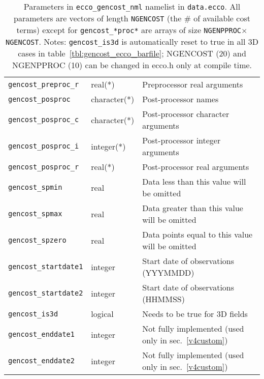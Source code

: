 \begin{table}[!ht]
\begin{tabular}{lll}
\texttt{gencost\_preproc\_r} 	&	real(*)			&	Preprocessor real arguments 	\\
\texttt{gencost\_posproc} 		&	character(*)	&	Post-processor names \\
\texttt{gencost\_posproc\_c} 	&	character(*)	&	Post-processor character arguments 	\\
\texttt{gencost\_posproc\_i} 	&	integer(*) 		&	Post-processor integer arguments 	\\
\texttt{gencost\_posproc\_r} 	&	real(*)			&	Post-processor real arguments 	\\
\hline
\texttt{gencost\_spmin}		&	real			&	Data less than this value will be omitted \\
\texttt{gencost\_spmax}		&	real			&	Data greater than this value will be omitted \\
\texttt{gencost\_spzero}		&	real			&	Data points equal to this value will be omitted \\
\texttt{gencost\_startdate1} 	&	integer			&	Start date of observations (YYYMMDD)	\\
\texttt{gencost\_startdate2} 	&	integer			&	Start date of observations (HHMMSS)				\\
\texttt{gencost\_is3d}			&	logical 		&	Needs to be true for 3D fields \\
\hline
\texttt{gencost\_enddate1} 	&	integer	&	Not fully implemented (used only in sec.~\ref{v4custom})\\
\texttt{gencost\_enddate2} 	&	integer	&	Not fully implemented (used only in sec.~\ref{v4custom})\\
\end{tabular}
\caption{Parameters in \texttt{ecco\_gencost\_nml} namelist in \texttt{data.ecco}. All parameters are vectors of length \texttt{NGENCOST} (the \# of available cost terms) except for \texttt{gencost\_*proc*} are arrays of size \texttt{NGENPPROC}$\times$\texttt{NGENCOST}. Notes: \texttt{gencost\_is3d} is automatically reset to true in all 3D cases in table~\ref{tbl:gencost_ecco_barfile}; 
NGENCOST (20) and NGENPPROC (10) can be changed in ecco.h only at compile time.}
\label{tbl:gencost_ecco_params}
\end{table}

